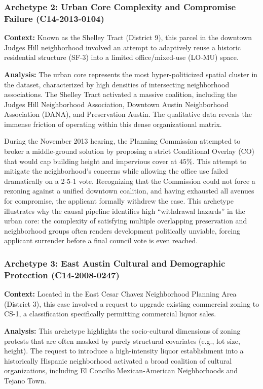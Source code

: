 \subsubsection{Archetype 2: Urban Core Complexity and Compromise Failure (C14-2013-0104)}
\textbf{Context:} Known as the Shelley Tract (District 9), this parcel in the downtown Judges Hill neighborhood involved an attempt to adaptively reuse a historic residential structure (SF-3) into a limited office/mixed-use (LO-MU) space.

\textbf{Analysis:} The urban core represents the most hyper-politicized spatial cluster in the dataset, characterized by high densities of intersecting neighborhood associations. The Shelley Tract activated a massive coalition, including the Judges Hill Neighborhood Association, Downtown Austin Neighborhood Association (DANA), and Preservation Austin. The qualitative data reveals the immense friction of operating within this dense organizational matrix.

During the November 2013 hearing, the Planning Commission attempted to broker a middle-ground solution by proposing a strict Conditional Overlay (CO) that would cap building height and impervious cover at $45\%$. This attempt to mitigate the neighborhood's concerns while allowing the office use failed dramatically on a 2-5-1 vote. Recognizing that the Commission could not force a rezoning against a unified downtown coalition, and having exhausted all avenues for compromise, the applicant formally withdrew the case. This archetype illustrates why the causal pipeline identifies high ``withdrawal hazards'' in the urban core: the complexity of satisfying multiple overlapping preservation and neighborhood groups often renders development politically unviable, forcing applicant surrender before a final council vote is even reached.

\subsubsection{Archetype 3: East Austin Cultural and Demographic Protection (C14-2008-0247)}
\textbf{Context:} Located in the East Cesar Chavez Neighborhood Planning Area (District 3), this case involved a request to upgrade existing commercial zoning to CS-1, a classification specifically permitting commercial liquor sales.

\textbf{Analysis:} This archetype highlights the socio-cultural dimensions of zoning protests that are often masked by purely structural covariates (e.g., lot size, height). The request to introduce a high-intensity liquor establishment into a historically Hispanic neighborhood activated a broad coalition of cultural organizations, including El Concilio Mexican-American Neighborhoods and Tejano Town. 

